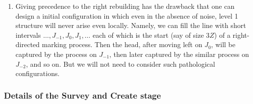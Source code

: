 \documentclass[11pt]{memoir}
\theoremstyle{definition} %
\def\B{B}
\newcommand{\Z}{Z}
\begin{document}
\begin{remarks}\label{rem:rebuild-precedence} 
  \begin{enumerate}

\item Giving precedence to the right rebuilding has the drawback that one can design a initial configuration
  in which even in the absence of noise, level 1 structure will never arise even locally.
  Namely, we can fill the line with short intervals \( \dots,J_{-1},J_{0},J_{1},\dots \)
  each of which is the start (say of size \( 3\Z \)) of a
  right-directed marking process.
  Then the head, after moving left on \( J_{0} \), will be captured by the process on \( J_{-1} \), then
  later captured by the similar process on \( J_{-2} \), and so on.
  But we will not need to consider such pathological configurations.
  \end{enumerate}
  
\end{remarks}

\subsubsection*{Details of the Survey and Create stage}
\end{document}
